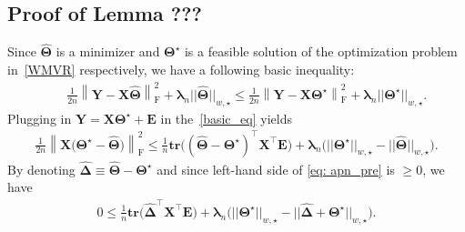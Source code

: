 \documentclass[alpha-refs]{wiley-article}
\begin{document}
\subsection{Proof of Lemma ???}

Since $\widehat{\boldsymbol{\Theta}}$ is a minimizer and $\boldsymbol{\Theta^{\star}}$ is a feasible solution of the optimization problem in~\eqref{WMVR} respectively, we have a following basic inequality:
\begin{eqnarray} \label{basic_eq}
    & & \frac{1}{2n} \left\| \boldsymbol{Y}-\boldsymbol{X}\boldsymbol{\widehat{\Theta}} \right\|_{\text{F}}^{2} + \boldsymbol{\lambda}_{n}||\widehat{\boldsymbol{\Theta}}||_{w,\star} \leq \frac{1}{2n}\left\| \boldsymbol{Y}-\boldsymbol{X}\boldsymbol{\Theta^{\star}} \right\|_{\text{F}}^{2} + \boldsymbol{\lambda}_{n}||\boldsymbol{\Theta^{\star}}||_{w,\star}.
\end{eqnarray}
Plugging in $\boldsymbol{Y}=\boldsymbol{X}\boldsymbol{\Theta^{\star}}+\boldsymbol{E}$ in the~\eqref{basic_eq} yields
\begin{align}
    \frac{1}{2n} \left\| \boldsymbol{X} \big(\boldsymbol{\Theta^{\star}}-\boldsymbol{\widehat{\Theta}}\big) \right\|_{\text{F}}^{2} \leq \frac{1}{n} \textbf{tr}\big( ( \boldsymbol{\widehat{\Theta}} - \boldsymbol{\Theta^{\star}})^{\top} \boldsymbol{X}^{\top}\boldsymbol{E} \big) +
    \boldsymbol{\lambda}_{n} \big( ||\boldsymbol{\Theta^{\star}}||_{w,\star} - ||\widehat{\boldsymbol{\Theta}}||_{w,\star} \big). \label{eq: apn_pre}
\end{align}
By denoting $\boldsymbol{\widehat{\Delta}} \equiv \widehat{\boldsymbol{\Theta}} - \boldsymbol{\Theta^{\star}} $ and since left-hand side of \eqref{eq: apn_pre} is $\geq 0$, we have
\begin{eqnarray}
    0 \leq \frac{1}{n} \textbf{tr}\big( \boldsymbol{\widehat{\Delta}}^{\top} \boldsymbol{X}^{\top}\boldsymbol{E} \big) + \boldsymbol{\lambda}_{n}\big( ||\boldsymbol{\Theta^{\star}}||_{w,\star} - ||\boldsymbol{\widehat{\Delta}} + \boldsymbol{\Theta^{\star}}||_{w,\star} \big).  \label{eq: apn_main}
\end{eqnarray}
\end{document}
